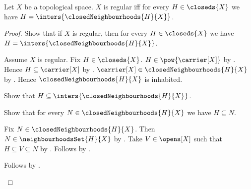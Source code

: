 \begin{theorem}\label{regular_iff_closed_is_intersection_of_closed_neighbourhoods}
    Let $X$ be a topological space.
    $X$ is regular iff for every $H\in\closeds{X}$ we have
        $H=\inters{\closedNeighbourhoods{H}{X}}$.
\end{theorem}
\begin{proof}
    Show that if $X$ is regular, then for every $H\in\closeds{X}$ we have
        $H=\inters{\closedNeighbourhoods{H}{X}}$.
    \begin{subproof}
        Assume $X$ is regular.
        Fix $H\in\closeds{X}$.
        $H\in\pow{\carrier[X]}$ by .
        Hence $H\subseteq\carrier[X]$ by .
        $\carrier[X]\in\closedNeighbourhoods{H}{X}$
            by .
        Hence $\closedNeighbourhoods{H}{X}$ is inhabited.

        Show that $H\subseteq\inters{\closedNeighbourhoods{H}{X}}$.
        \begin{subproof}
            Show that for every $N\in\closedNeighbourhoods{H}{X}$
                we have $H\subseteq N$.
            \begin{subproof}
                Fix $N\in\closedNeighbourhoods{H}{X}$.
                Then $N\in\neighbourhoodsSet{H}{X}$
                    by .
                Take $V\in\opens[X]$ such that $H\subseteq V\subseteq N$
                    by .
                Follows by .
            \end{subproof}
            Follows by .
        \end{subproof}


\end{subproof}
\end{proof}
